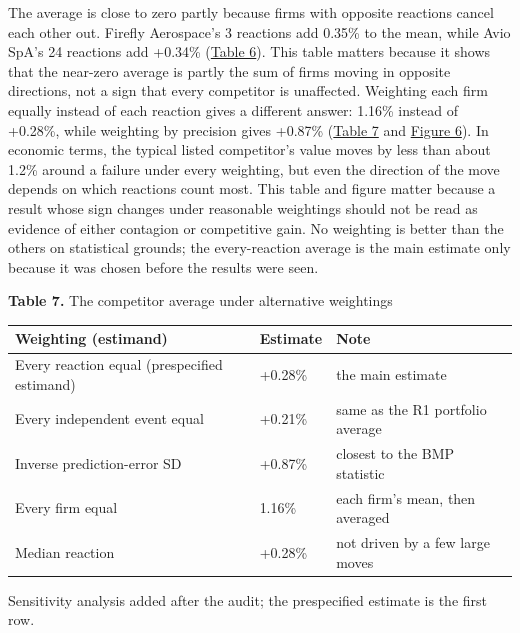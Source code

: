 \documentclass[12pt,a4paper]{article}
\begin{document}
The average is close to zero partly because firms with opposite reactions cancel each other out. Firefly Aerospace's 3 reactions add \textminus{}0.35\% to the mean, while Avio SpA's 24 reactions add +0.34\% (\hyperlink{tab-contrib}{Table 6}). This table matters because it shows that the near-zero average is partly the sum of firms moving in opposite directions, not a sign that every competitor is unaffected. Weighting each firm equally instead of each reaction gives a different answer: \textminus{}1.16\% instead of +0.28\%, while weighting by precision gives +0.87\% (\hyperlink{tab-wt}{Table 7} and \hyperlink{fig-weights}{Figure 6}). In economic terms, the typical listed competitor's value moves by less than about 1.2\% around a failure under every weighting, but even the direction of the move depends on which reactions count most. This table and figure matter because a result whose sign changes under reasonable weightings should not be read as evidence of either contagion or competitive gain. No weighting is better than the others on statistical grounds; the every-reaction average is the main estimate only because it was chosen before the results were seen.

\par\noindent\begin{minipage}{\textwidth}\hypertarget{tab-wt}{}
\textbf{Table 7.} The competitor average under alternative weightings

{\small\setlength{\tabcolsep}{4pt}\begin{tabularx}{\textwidth}{XlX}
\toprule
\textbf{Weighting (estimand)} & \textbf{Estimate} & \textbf{Note} \\
\midrule
Every reaction equal (prespecified estimand) & +0.28\% & the main estimate \\
Every independent event equal & +0.21\% & same as the R1 portfolio average \\
Inverse prediction-error SD & +0.87\% & closest to the BMP statistic \\
Every firm equal & \textminus{}1.16\% & each firm's mean, then averaged \\
Median reaction & +0.28\% & not driven by a few large moves \\
\bottomrule
\end{tabularx}}
\vspace{6pt}

Sensitivity analysis added after the audit; the prespecified estimate is the first row.

\end{minipage}\par\vspace{4pt}
\end{document}
